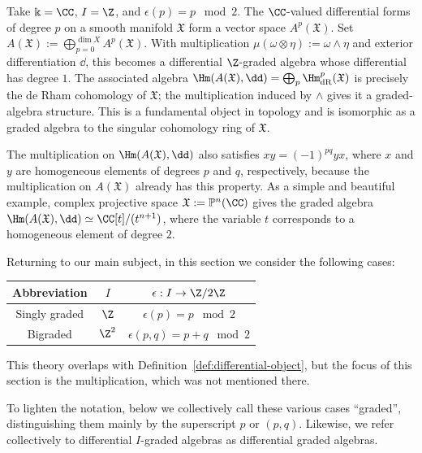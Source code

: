 \begin{example}
	Take $\Bbbk=\CC$, $I=\Z$, and $\epsilon(p)=p\;\bmod2$. The
	$\CC$-valued differential forms of degree $p$ on a smooth manifold
	$\mathfrak{X}$ form a vector space $A^p(\mathfrak{X})$. Set
	$A(\mathfrak{X}):=\bigoplus_{p=0}^{\dim X}A^p(\mathfrak{X})$. With
	multiplication $\mu(\omega\otimes\eta):=\omega\wedge\eta$ and exterior
	differentiation $\dd$, this becomes a differential $\Z$-graded algebra
	whose differential has degree $1$. The associated algebra
	$\Hm(A(\mathfrak{X}),\dd)=\bigoplus_p\Hm^p_{\mathrm{dR}}(\mathfrak{X})$
	is precisely the de Rham cohomology of $\mathfrak{X}$; the multiplication
	induced by $\wedge$ gives it a graded-algebra structure. This is a
	fundamental object in topology and is isomorphic as a graded algebra to the
	singular cohomology ring of $\mathfrak{X}$.

	The multiplication on $\Hm(A(\mathfrak{X}),\dd)$ also satisfies
	$xy=(-1)^{pq}yx$, where $x$ and $y$ are homogeneous elements of degrees
	$p$ and $q$, respectively, because the multiplication on
	$A(\mathfrak{X})$ already has this property. As a simple and beautiful
	example, complex projective space $\mathfrak{X}:=\mathbb{P}^n(\CC)$ gives
	the graded algebra
	$\Hm(A(\mathfrak{X}),\dd)\simeq\CC[t]/(t^{n+1})$, where the variable $t$
	corresponds to a homogeneous element of degree $2$.
\end{example}

Returning to our main subject, in this section we consider the following
cases:
\begin{center}\begin{tabular}{|c|c|c|} \hline
	Abbreviation & $I$ & $\epsilon:I\to\Z/2\Z$ \\ \hline
	Singly graded & $\Z$ & $\epsilon(p)=p\;\bmod2$ \\
	Bigraded & $\Z^2$ & $\epsilon(p,q)=p+q\;\bmod2$ \\ \hline
\end{tabular}\end{center}

This theory overlaps with Definition~\ref{def:differential-object}, but the
focus of this section is the multiplication, which was not mentioned there.

To lighten the notation, below we collectively call these various cases
``graded'', distinguishing them mainly by the superscript $p$ or $(p,q)$.
Likewise, we refer collectively to differential $I$-graded algebras as
differential graded algebras.

